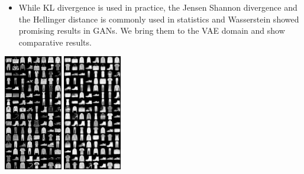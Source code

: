 \documentclass[a0]{a0poster}
\begin{document}
\hfill
\begin{minipage}[t]{0.32\textwidth}
    \vspace{0cm}
    \begin{minipage}{1.0\columnwidth}
    \Large
{}
\begin{itemize}
	\item {\Large While KL divergence is used in practice, the Jensen Shannon divergence and the Hellinger distance is commonly used in statistics and Wasserstein showed promising results in GANs. We bring them to the VAE domain and show comparative results.}
\end{itemize}
\begin{minipage}{\columnwidth}
	\vspace{1cm}
	\centering
  \includegraphics[width=0.19\textwidth, trim={0 13.75cm 3.15cm 0}, clip]{figures/original.png}
  \includegraphics[width=0.19\textwidth, trim={0 13.75cm 3.15cm 0}, clip]{figures/fashion_kld_reconst_sai.png}

\end{minipage}
\end{minipage}
\end{minipage}
\end{document}
